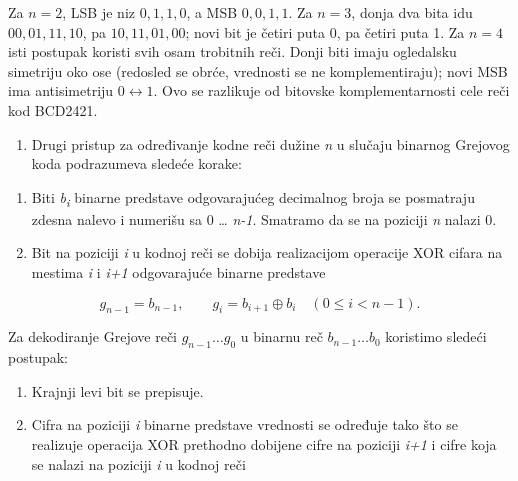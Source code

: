 \documentclass[a4paper,11pt]{article}
\numberwithin{equation}{section}
\begin{document}
Za $n=2$, LSB je niz $0,1,1,0$, a MSB $0,0,1,1$. Za $n=3$, donja dva bita idu $00,01,11,10$, pa $10,11,01,00$; novi bit je četiri puta 0, pa četiri puta 1. Za $n=4$ isti postupak koristi svih osam trobitnih reči. Donji biti imaju ogledalsku simetriju oko ose (redosled se obrće, vrednosti se ne komplementiraju); novi MSB ima antisimetriju $0\leftrightarrow1$. Ovo se razlikuje od bitovske komplementarnosti cele reči kod BCD2421.\par


\begin{enumerate}[label=\Roman*),start=2,leftmargin=*]
\item Drugi pristup za određivanje kodne reči dužine \emph{n} u slučaju binarnog Grejovog koda podrazumeva sledeće korake:

\end{enumerate}


\begin{enumerate}[label=\arabic*.,start=1,leftmargin=*]
\item Biti \emph{b\textsubscript{i}} binarne predstave odgovarajućeg decimalnog broja se posmatraju zdesna nalevo i numerišu sa 0 \ldots{} \emph{n-1}. Smatramo da se na poziciji \emph{n} nalazi 0.

\item Bit na poziciji \emph{i} u kodnoj reči se dobija realizacijom operacije XOR cifara na mestima \emph{i} i \emph{i+1} odgovarajuće binarne predstave

\end{enumerate}


\begin{equation}\label{eq:gray-kodiranje}
g_{n-1}=b_{n-1},\qquad g_i=b_{i+1}\oplus b_i\quad(0\le i<n-1).
\end{equation}


Za dekodiranje Grejove reči $g_{n-1}\dots g_0$ u binarnu reč $b_{n-1}\dots b_0$ koristimo sledeći postupak:

\begin{enumerate}[label=\arabic*.,start=1,leftmargin=*]
\item Krajnji levi bit se prepisuje.

\item Cifra na poziciji \emph{i} binarne predstave vrednosti se određuje tako što se realizuje operacija XOR prethodno dobijene cifre na poziciji \emph{i+1} i cifre koja se nalazi na poziciji \emph{i} u kodnoj reči

\end{enumerate}
\end{document}
